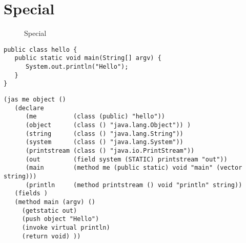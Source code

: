 \documentclass{article}
\begin{document}
\section{Special}
\begin{figure}\begin{center}
\caption{Special}\label{Special}\end{center}\end{figure}

\begin{verbatim}
public class hello {
   public static void main(String[] argv) {
      System.out.println("Hello");
   }
}
\end{verbatim}

\begin{verbatim}
(jas me object ()
   (declare
      (me          (class (public) "hello"))
      (object      (class () "java.lang.Object")) )
      (string      (class () "java.lang.String"))
      (system      (class () "java.lang.System"))
      (printstream (class () "java.io.PrintStream"))
      (out         (field system (STATIC) printstream "out"))
      (main        (method me (public static) void "main" (vector string)))
      (println     (method printstream () void "println" string))
   (fields )
   (method main (argv) ()
     (getstatic out)
     (push object "Hello")
     (invoke virtual println)
     (return void) ))
\end{verbatim}
\end{document}
